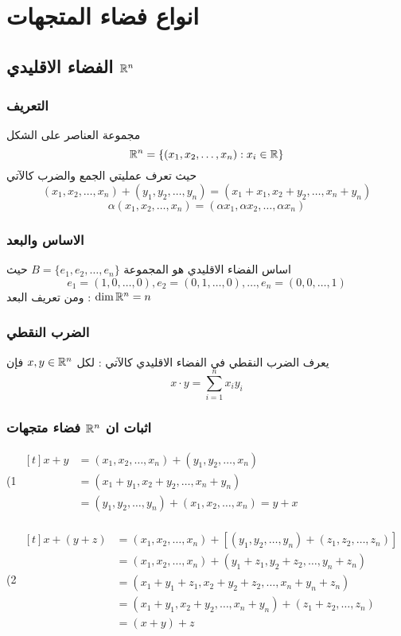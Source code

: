 \chapter{انواع فضاء المتجهات}

\section{الفضاء الاقليدي $\mathbb{R}^n$}
\subsection{التعريف}

مجموعة العناصر على الشكل
\[
\mathbb{R}^n = \{(x_1, x_2, \dots, x_n) : x_i \in \mathbb{R}\}
\]
حيث تعرف عمليتي الجمع والضرب كالآتي
\[
(x_1, x_2, \dots, x_n) + (y_1, y_2, \dots, y_n)  = (x_1+x_1, x_2+y_2, \dots, x_n+y_n) 
\]  
\[
\alpha (x_1, x_2, \dots, x_n)  = (\alpha x_1,\alpha x_2, \dots, \alpha x_n) 
\]

\subsection{الاساس والبعد}
اساس الفضاء الاقليدي هو المجموعة $B = \{e_1, e_2, \dots, e_n \}$
حيث 
\[
e_1 = (1,0,\dots,0) , e_2 = (0,1,\dots,0) , \dots , e_n = (0,0,\dots,1)
\]
ومن تعريف البعد : $\dim\mathbb{R}^n = n$

\subsection{الضرب النقطي}
يعرف الضرب النقطي في الفضاء الاقليدي كالآتي : لكل $x, y\in \mathbb{R}^n$ فإن
\[
x \cdot y = \sum_{i=1}^{n} x_i y_i
\]

\subsection{اثبات ان $\mathbb{R}^n$ فضاء متجهات}

\setLR
\noindent
(1 $
\begin{aligned}[t]
	x + y &= (x_1, x_2, \dots, x_n) + (y_1, y_2, \dots, x_n)\\
	&= (x_1+y_1, x_2+y_2, \dots, x_n + y_n)\\
	&= (y_1, y_2, \dots, y_n) + (x_1, x_2, \dots, x_n) = y + x
\end{aligned}
$\\ \\
(2 $
\begin{aligned}[t]
	x + (y + z) &= (x_1, x_2, \dots, x_n) + [(y_1, y_2, \dots, y_n) + (z_1, z_2, \dots, z_n)]\\
	&= (x_1, x_2, \dots, x_n) + (y_1+z_1, y_2+z_2, \dots, y_n+z_n)\\
	&=  (x_1+y_1+z_1, x_2+y_2+z_2, \dots, x_n+y_n+z_n)\\
	&=  (x_1+y_1, x_2+y_2, \dots, x_n+y_n) + (z_1+z_2,\dots,z_n)\\
	&= (x+y) + z
\end{aligned}
$\\

